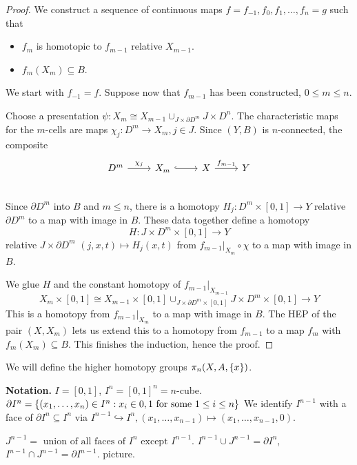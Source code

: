 \documentclass{TemplateLecture}
\begin{document}
\begin{proof}
    We construct a sequence of continuous maps \(f = f_{-1}, f_0, f_1, \dots, f_n = g\) such that
    \begin{itemize}
        \item \(f_m\) is homotopic to \(f_{m-1}\) relative \(X_{m-1}\).
        \item \(f_m(X_m) \subseteq B\).
    \end{itemize}
    We start with \(f_{-1} = f\). Suppose now that \(f_{m-1}\) has been constructed, \(0 \leq m \leq n\).

    Choose a presentation \(\psi\colon X_m \cong X_{m-1} \cup_{J \times \partial D^m} J\times D^n\). The characteristic maps for the \(m\)-cells are maps \(\chi_j\colon D^m \to X_m, j \in J\). Since \((Y,B)\) is \(n\)-connected, the composite
    \[\begin{tikzcd}
        D^m \ar[r, "\chi_j"] & X_m \ar[r, hook] & X \ar[r, "f_{m-1}"] & Y \\
    \end{tikzcd}\]
    Since \(\partial D^m\) into \(B\) and \(m \leq n\), there is a homotopy \(H_j \colon D^m\times [0,1] \to Y\) relative \(\partial D^m\) to a map with image in \(B\). These data together define a homotopy
    \[H\colon J\times D^m \times [0,1] \to Y\]
    relative \(J\times \partial D^m\) \((j,x,t) \mapsto H_j(x,t)\) from \(f_{m-1}\rvert_{X_m} \circ \chi\) to a map with image in \(B\).

    We glue \(H\) and the constant homotopy of
    \(f_{m-1}\rvert_{X_{m-1}}\)
    \[X_m \times [0,1] \cong X_{m-1} \times [0,1] \cup_{J \times \partial D^m \times [0,1]} J\times D^m \times [0,1] \to Y\] %
    This is a homotopy from \(f_{m-1}\rvert_{X_m}\) to a map with image in \(B\). The HEP of the pair \((X, X_m)\) lets us extend this to a homotopy from \(f_{m-1}\) to a map \(f_m\) with \(f_m(X_m) \subseteq B\). This finishes the induction, hence the proof.
\end{proof}


We will define the higher homotopy groups \(\pi_n(X,A,\{x\})\).

\textbf{Notation.} \(I = [0,1]\), \(I^n = [0,1]^n = n\)-cube. \(\partial I^n = \{(x_1, \dots, x_n) \in I^n : x_i \in {0,1} \text{ for some } 1 \leq i \leq n\}\) We identify \(I^{n-1}\) with a face of \(\partial  I^n \subseteq I^n\) via \(I^{n-1} \hookrightarrow I^n, (x_1, \dots, x_{n-1}) \mapsto (x_1, \dots, x_{n-1}, 0)\).

\(J^{n-1} = \text{ union of all faces of } I^n \text{ except } I^{n-1}\). \(I^{n-1} \cup J^{n-1} = \partial I^n\), \(I^{n-1} \cap J^{n-1} = \partial I^{n-1}\). picture.
\end{document}
